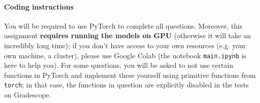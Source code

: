 \documentclass[12pt]{article}
\begin{document}
\paragraph{Coding instructions} You will be required to use PyTorch to complete all questions. Moreover, this assignment \textbf{requires running the models on GPU} (otherwise it will take an incredibly long time); if you don't have access to your own resources (e.g. your own machine, a cluster), please use Google Colab (the notebook \texttt{main.ipynb} is here to help you). For some questions, you will be asked to not use certain functions in PyTorch and implement these yourself using primitive functions from \texttt{torch}; in that case, the functions in question are explicitly disabled in the tests on Gradescope.

\setlength{\parindent}{0cm}
\end{document}
